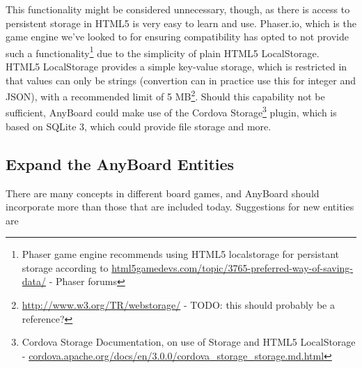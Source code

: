 This functionality might be considered unnecessary, though, as there is access to persistent storage in HTML5 is very easy to learn and use. Phaser.io, which is the game engine we've looked to for ensuring compatibility has opted to not provide such a functionality\footnote{Phaser game engine recommends using HTML5 localstorage for persistant storage according to \href{http://www.html5gamedevs.com/topic/3765-preferred-way-of-saving-data/}{html5gamedevs.com/topic/3765-preferred-way-of-saving-data/} - Phaser forums} due to the simplicity of plain HTML5 LocalStorage. HTML5 LocalStorage provides a simple key-value storage, which is restricted in that values can only be strings (convertion can in practice use this for integer and JSON), with a recommended limit of 5 MB\footnote{\href{http://www.w3.org/TR/webstorage/}{http://www.w3.org/TR/webstorage/} - TODO: this should probably be a reference?}. Should this capability not be sufficient, AnyBoard could make use of the Cordova Storage\footnote{Cordova Storage Documentation, on use of Storage and HTML5 LocalStorage - \href{https://cordova.apache.org/docs/en/3.0.0/cordova\_storage\_storage.md.html}{cordova.apache.org/docs/en/3.0.0/cordova\_storage\_storage.md.html}} plugin, which is based on SQLite 3, which could provide file storage and more. 

\subsection{Expand the AnyBoard Entities}
There are many concepts in different board games, and AnyBoard should incorporate more than those that are included today. Suggestions for new entities are 

